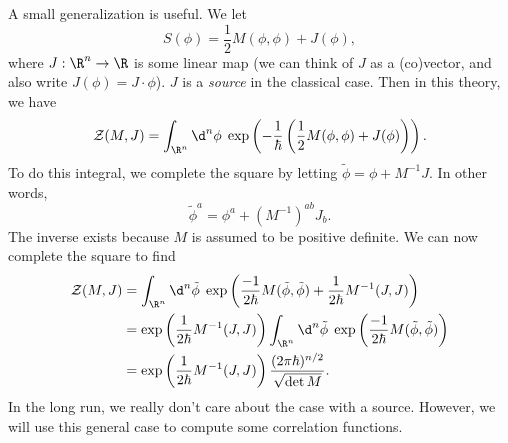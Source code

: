 \documentclass[a4paper]{article}
\begin{document}
A small generalization is useful. We let
\[
  S(\phi) = \frac{1}{2} M(\phi, \phi) + J(\phi),
\]
where $J: \R^n \to \R$ is some linear map (we can think of $J$ as a (co)vector, and also write $J(\phi) = J \cdot \phi$). $J$ is a \emph{source} in the classical case. Then in this theory, we have
\[
  \mathcal{Z}(M, J) = \int_{\R^n} \d^n \phi\; \exp\left(-\frac{1}{\hbar}\left(\frac{1}{2} M(\phi, \phi) + J(\phi)\right)\right).
\]
To do this integral, we complete the square by letting $\tilde{\phi} = \phi + M^{-1}J$. In other words,
\[
  \tilde{\phi}^a = \phi^a + (M^{-1})^{ab} J_b.
\]
The inverse exists because $M$ is assumed to be positive definite. We can now complete the square to find
\begin{align*}
  \mathcal{Z}(M, J) &= \int_{\R^n} \d^n \tilde{\phi} \;\exp\left(\frac{-1}{2\hbar}M(\tilde{\phi}, \tilde{\phi}) + \frac{1}{2\hbar}M^{-1}(J, J)\right)\\
  &= \exp\left(\frac{1}{2\hbar}M^{-1}(J, J)\right)\int_{\R^n} \d^n \tilde{\phi} \;\exp\left(\frac{-1}{2\hbar}M(\tilde{\phi}, \tilde{\phi})\right)\\
  &= \exp\left(\frac{1}{2\hbar}M^{-1}(J, J)\right) \frac{(2\pi \hbar)^{n/2}}{\sqrt{\det M}}.
\end{align*}
In the long run, we really don't care about the case with a source. However, we will use this general case to compute some correlation functions.
\end{document}
